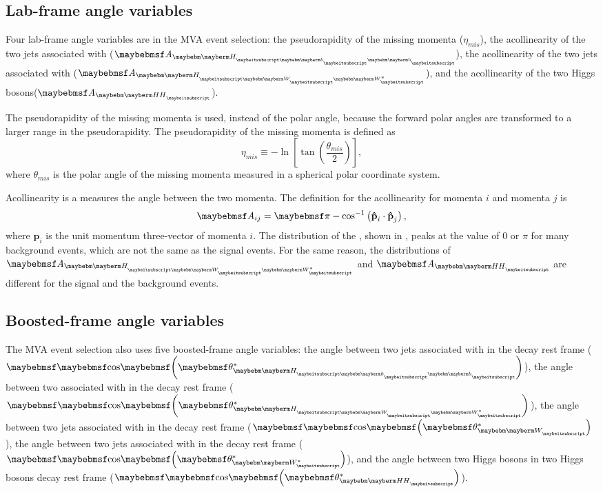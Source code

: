 \subsection{Lab-frame angle variables}

Four lab-frame angle variables are in the MVA event selection: the pseudorapidity of the missing momenta ($\eta_{mis}$), the  acollinearity of the two jets associated with \Hbb ($\acolinearity{\Hbb}$),  the  acollinearity of the two jets associated with \HWW ($\acolinearity{\HWW}$), and the  acollinearity of the two Higgs bosons($\acolinearity{\HH}$).

The pseudorapidity   of the missing momenta is used, instead of the polar angle, because the forward polar angles are transformed to a larger range in the pseudorapidity. The pseudorapidity of the missing momenta is defined as
\begin{equation}
\eta_{mis} \equiv  - \ln \left[ \tan \left( \frac{\theta_{mis}}{2} \right) \right],
\end{equation}
where $\theta_{mis}$ is the polar angle of the missing momenta measured in a spherical polar coordinate system.

Acollinearity is a measures the angle between the two momenta. The definition for the acollinearity for momenta $i$ and momenta $j$ is
\begin{equation}
\acolinearity{ij} = \pi - \cos^{-1}\left(\textbf{\^{p}}_i\cdot\textbf{\^{p}}_j\right),
\end{equation}
where $\textbf{\^{p}}_i$ is the unit momentum three-vector of momenta $i$. The distribution of the \acolinearity{\Hbb}, shown in , peaks at the value of 0 or $\pi$ for many background events, which are not the same as the signal events. For the same reason, the distributions of $\acolinearity{\HWW}$ and $\acolinearity{\HH}$ are different for the signal and the background events.

\subsection{Boosted-frame angle variables}

The MVA event selection also uses five boosted-frame angle variables: the angle between two jets associated with \Hbb in the \Hbb decay rest frame ($\cosStar{\Hbb}$), the angle between two \PW associated with \HWW in the \HWW decay rest frame ($\cosStar{\HWW}$), the angle between two jets associated with \PW in the \PW decay rest frame ($\cosStar{\PW}$), the angle between two jets associated with \W* in the \W* decay rest frame ($\cosStar{\W*}$), and the angle between two Higgs bosons in two Higgs bosons decay rest frame ($\cosStar{\HH}$).

